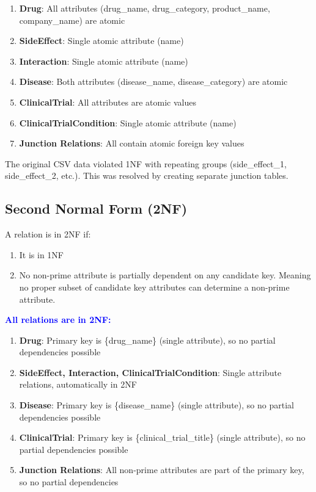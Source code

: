 \documentclass[12pt,a4paper]{article}
\begin{document}
\begin{enumerate}
    \item \textbf{Drug}: All attributes (drug\_name, drug\_category, product\_name, company\_name) are atomic
    \item \textbf{SideEffect}: Single atomic attribute (name)
    \item \textbf{Interaction}: Single atomic attribute (name)
    \item \textbf{Disease}: Both attributes (disease\_name, disease\_category) are atomic
    \item \textbf{ClinicalTrial}: All attributes are atomic values
    \item \textbf{ClinicalTrialCondition}: Single atomic attribute (name)
    \item \textbf{Junction Relations}: All contain atomic foreign key values
\end{enumerate}

The original CSV data violated 1NF with repeating groups (side\_effect\_1, side\_effect\_2, etc.). This was resolved by creating separate junction tables.

\subsection{Second Normal Form (2NF)}

A relation is in 2NF if:
\begin{enumerate}
    \item It is in 1NF
    \item No non-prime attribute is partially dependent on any candidate key. Meaning no proper subset of candidate key attributes can determine a non-prime attribute.
\end{enumerate}

\textcolor{blue}{\textbf{All relations are in 2NF:}}

\begin{enumerate}
    \item \textbf{Drug}: Primary key is \{drug\_name\} (single attribute), so no partial dependencies possible
    \item \textbf{SideEffect, Interaction, ClinicalTrialCondition}: Single attribute relations, automatically in 2NF
    \item \textbf{Disease}: Primary key is \{disease\_name\} (single attribute), so no partial dependencies possible
    \item \textbf{ClinicalTrial}: Primary key is \{clinical\_trial\_title\} (single attribute), so no partial dependencies possible
    \item \textbf{Junction Relations}: All non-prime attributes are part of the primary key, so no partial dependencies
\end{enumerate}
\end{document}
